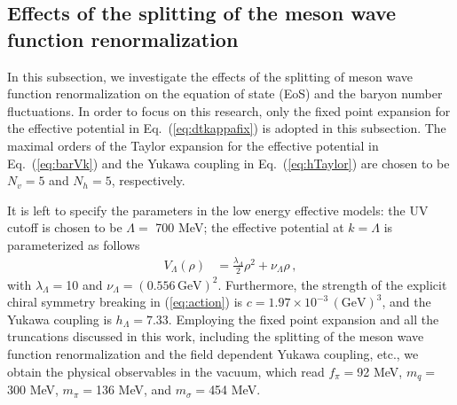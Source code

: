 \documentclass[%
reprint,
superscriptaddress,
showpacs,preprintnumbers,
 amsmath,amssymb,
 aps,
prd,
]{revtex4-1}
\def\Eq#1{Eq.~(\ref{#1})}
\def\eq#1{(\ref{#1})}
\begin{document}
\subsection{Effects of the splitting of the meson wave function renormalization}
\label{sec:splitting}

In this subsection, we investigate the effects of the splitting of meson wave function renormalization on the equation of state (EoS) and the baryon number fluctuations. In order to focus on this research, only the fixed point expansion for the effective potential in \Eq{eq:dtkappafix} is adopted in this subsection. The maximal orders of the Taylor expansion for the effective potential in \Eq{eq:barVk} and the Yukawa coupling in \Eq{eq:hTaylor} are chosen to be $N_v=5$ and $N_h=5$, respectively.

It is left to specify the parameters in the low energy effective models: the UV cutoff is chosen to be $\Lambda=$ 700 MeV; the effective potential at $k=\Lambda$ is parameterized as follows
\begin{align}
  V_\Lambda(\rho)&=\frac{\lambda_\Lambda}{2}\rho^2+\nu_\Lambda\rho\,,\label{}
\end{align}
with $\lambda_\Lambda=$10 and $\nu_\Lambda=(0.556\,\mathrm{GeV})^2$. Furthermore, the strength of the explicit chiral symmetry breaking in \eq{eq:action} is $c=1.97\times 10^{-3}\,(\mathrm{GeV})^3$, and the Yukawa coupling is $h_\Lambda=7.33$. Employing the fixed point expansion and all the truncations discussed in this work, including the splitting of the meson wave function renormalization and the field dependent Yukawa coupling, etc., we obtain the physical observables in the vacuum, which read $f_\pi=$92 MeV, $m_q=$300 MeV, $m_\pi=$136 MeV, and $m_\sigma=$454 MeV. 
\end{document}

